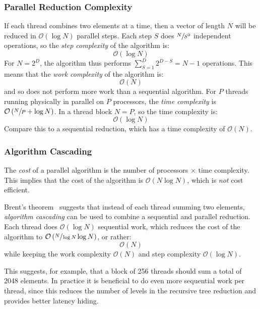\subsubsection{Parallel Reduction Complexity}
\label{sec:parallel_reduction_complexity}

If each thread combines two elements at a time, then a vector of length $N$ will
be reduced in $\mathcal{O}\left( \log N \right)$ parallel steps. Each step $S$
does $\sfrac{N}{S^2}$ independent operations, so the \emph{step
complexity} of the algorithm is:
\[
\mathcal{O}\left( \log N \right)
\]
For $N=2^{D}$, the algorithm thus performs $\sum_{S=1}^{D}2^{D-S} = N - 1$
operations. This means that the \emph{work complexity} of
the algorithm is:
\[
\mathcal{O}\left( N \right)
\]
and so does not perform more work than a sequential algorithm. For $P$ threads
running physically in parallel on $P$ processors, the \emph{time
complexity} is $\mathcal{O}\left( \sfrac{N}{P} + \log N
\right)$. In a thread block $N = P$, so the time complexity is:
\[
\mathcal{O}\left( \log N \right)
\]
Compare this to a sequential reduction, which has a time complexity of
$\mathcal{O}\left( N \right)$.

\subsubsection{Algorithm Cascading}
\label{sec:algorithm_cascading}

The \emph{cost} of a parallel algorithm is the number of processors $\times$
time complexity. This implies that the cost of the algorithm is
$\mathcal{O}\left( N \log N \right)$, which is \emph{not} cost efficient.

Brent's theorem~\cite{Chatterjee:2009vh} suggests that instead of each thread
summing two elements, \emph{algorithm cascading} can be used to combine a
sequential and parallel reduction. Each thread does $\mathcal{O}\left( \log N
\right)$ sequential work, which reduces the cost of the algorithm to
$\mathcal{O}\left( \sfrac{N}{\log N} \log N \right)$, or rather:
\[
\mathcal{O}\left( N \right)
\]
while keeping the work complexity $\mathcal{O}\left( N \right)$ and step
complexity $\mathcal{O}\left( \log N \right)$.

This suggests, for example, that a block of 256 threads should sum a total of
2048 elements. In practice it is beneficial to do even more sequential work per
thread, since this reduces the number of levels in the recursive tree reduction
and provides better latency hiding.



